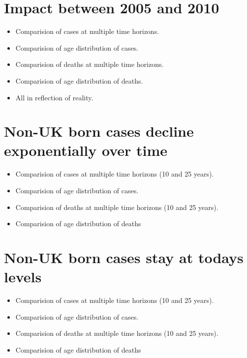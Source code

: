 \documentclass[11pt,twoside]{bristolthesis}
\providecommand{\tightlist}{%
  \setlength{\itemsep}{0pt}\setlength{\parskip}{0pt}}
\begin{document}
  \hypertarget{impact-between-2005-and-2010}{%
  \section{Impact between 2005 and 2010}\label{impact-between-2005-and-2010}}
  \begin{itemize}
  \tightlist
  \item
    Comparision of cases at multiple time horizons.
  \item
    Comparision of age distribution of cases.
  \item
    Comparision of deaths at multiple time horizons.
  \item
    Comparision of age distribution of deaths.
  \item
    All in reflection of reality.
  \end{itemize}
  \hypertarget{non-uk-born-cases-decline-exponentially-over-time}{%
  \section{Non-UK born cases decline exponentially over time}\label{non-uk-born-cases-decline-exponentially-over-time}}
  \begin{itemize}
  \tightlist
  \item
    Comparision of cases at multiple time horizons (10 and 25 years).
  \item
    Comparision of age distribution of cases.
  \item
    Comparision of deaths at multiple time horizons (10 and 25 years).
  \item
    Comparision of age distribution of deaths
  \end{itemize}
  \hypertarget{non-uk-born-cases-stay-at-todays-levels}{%
  \section{Non-UK born cases stay at todays levels}\label{non-uk-born-cases-stay-at-todays-levels}}
  \begin{itemize}
  \tightlist
  \item
    Comparision of cases at multiple time horizons (10 and 25 years).
  \item
    Comparision of age distribution of cases.
  \item
    Comparision of deaths at multiple time horizons (10 and 25 years).
  \item
    Comparision of age distribution of deaths
  \end{itemize}
\end{document}

